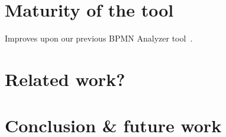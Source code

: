 \documentclass[
twocolumn,
]{ceurart}
\begin{document}
\section{Maturity of the tool}
Improves upon our previous BPMN Analyzer tool~\cite{krauterFormalizationAnalysisBPMN2023}.



\section{Related work?}

\section{Conclusion \& future work}



\end{document}

